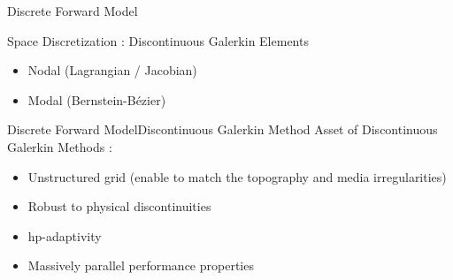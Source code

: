 \begin{frame}{Discrete Forward Model}

  \begin{multicols}{2}

    Space Discretization : Discontinuous Galerkin Elements
    \begin{itemize}
      \item Nodal (Lagrangian / Jacobian)
      \item Modal (Bernstein-Bézier)
    \end{itemize}
    \vspace{1cm}

    \columnbreak



  \end{multicols}

\end{frame}


\begin{frame}{Discrete Forward Model}{Discontinuous Galerkin Method}
  Asset of Discontinuous Galerkin Methods : \\

  \begin{itemize}
  \item Unstructured grid (enable to match the topography and media irregularities)
  \item Robust to physical discontinuities
  \item hp-adaptivity
  \item Massively parallel performance properties
  \end{itemize}

  \begin{figure}[H]
    \subfigure[h-adaptivity]{
      
}
    \hspace{1cm}
\end{figure}
\end{frame}
